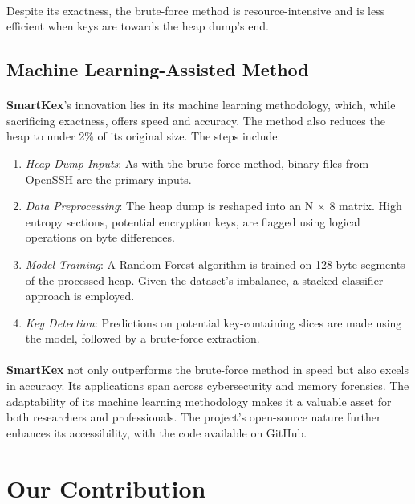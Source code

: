     \paragraph{}Despite its exactness, the brute-force method is resource-intensive and is less efficient when keys are towards the heap dump's end.

    \subsection{Machine Learning-Assisted Method}

    \paragraph{}\textbf{SmartKex}'s innovation lies in its machine learning methodology, which, while sacrificing exactness, offers speed and accuracy. The method also reduces the heap to under 2\% of its original size. The steps include:
    \begin{enumerate}
        \item \textit{Heap Dump Inputs}: As with the brute-force method, binary files from OpenSSH are the primary inputs.
        \item \textit{Data Preprocessing}: The heap dump is reshaped into an N × 8 matrix. High entropy sections, potential encryption keys, are flagged using logical operations on byte differences.
        \item \textit{Model Training}: A Random Forest algorithm is trained on 128-byte segments of the processed heap. Given the dataset's imbalance, a stacked classifier approach is employed.
        \item \textit{Key Detection}: Predictions on potential key-containing slices are made using the model, followed by a brute-force extraction.
    \end{enumerate}
    \paragraph{}\textbf{SmartKex} not only outperforms the brute-force method in speed but also excels in accuracy. Its applications span across cybersecurity and memory forensics. The adaptability of its machine learning methodology makes it a valuable asset for both researchers and professionals. The project's open-source nature further enhances its accessibility, with the code available on GitHub.
    

\section{Our Contribution}

